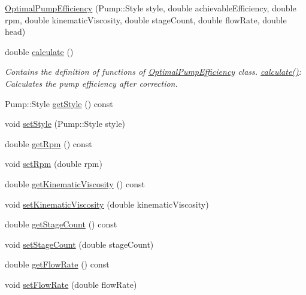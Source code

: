 \begin{DoxyCompactItemize}
\item 
\hyperlink{class_optimal_pump_efficiency_ae07626ea079ff810ac6518d54c52b24a}{Optimal\+Pump\+Efficiency} (Pump\+::\+Style style, double achievable\+Efficiency, double rpm, double kinematic\+Viscosity, double stage\+Count, double flow\+Rate, double head)
\item 
double \hyperlink{class_optimal_pump_efficiency_ac40720d1fcdf40d8b364df37e58e7f4d}{calculate} ()
\begin{DoxyCompactList}\small\item\em Contains the definition of functions of \hyperlink{class_optimal_pump_efficiency}{Optimal\+Pump\+Efficiency} class. \hyperlink{class_optimal_pump_efficiency_ac40720d1fcdf40d8b364df37e58e7f4d}{calculate()}\+: Calculates the pump efficiency after correction. \end{DoxyCompactList}\item 
Pump\+::\+Style \hyperlink{class_optimal_pump_efficiency_a601fe15e9acc23112743fabe417030fb}{get\+Style} () const
\item 
void \hyperlink{class_optimal_pump_efficiency_ab6b85c8c08d6641c5375c65436f16a2f}{set\+Style} (Pump\+::\+Style style)
\item 
double \hyperlink{class_optimal_pump_efficiency_a58e8a430ced612e0518abd07fb30b085}{get\+Rpm} () const
\item 
void \hyperlink{class_optimal_pump_efficiency_afc6b6f46b4e289efc8819249ad1c9fb5}{set\+Rpm} (double rpm)
\item 
double \hyperlink{class_optimal_pump_efficiency_a8c2f7fcacce2b42ed83f29aec2d4671e}{get\+Kinematic\+Viscosity} () const
\item 
void \hyperlink{class_optimal_pump_efficiency_a00017e0bd100beb2f4b0bf2db5e3687f}{set\+Kinematic\+Viscosity} (double kinematic\+Viscosity)
\item 
double \hyperlink{class_optimal_pump_efficiency_aac0c1a4a6492bf00b245c2a61d100eaa}{get\+Stage\+Count} () const
\item 
void \hyperlink{class_optimal_pump_efficiency_a5b0b2a24a87c1c8fc92aa96c6ba4b727}{set\+Stage\+Count} (double stage\+Count)
\item 
double \hyperlink{class_optimal_pump_efficiency_a77c6618681b0fd3a0fc02dc49d16ee99}{get\+Flow\+Rate} () const
\item 
void \hyperlink{class_optimal_pump_efficiency_a90067b57c559fd3274fb8d6e00f6221d}{set\+Flow\+Rate} (double flow\+Rate)
\item 

\end{DoxyCompactItemize}
